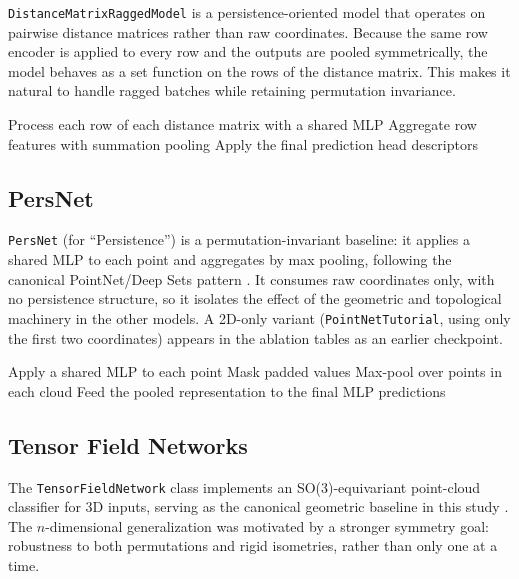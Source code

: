\documentclass[a4paper,11pt]{article}
\begin{document}
\texttt{DistanceMatrixRaggedModel} is a persistence-oriented model that operates on pairwise distance matrices rather than raw coordinates.
Because the same row encoder is applied to every row and the outputs are pooled symmetrically, the model behaves as a set function on the rows of the distance matrix.
This makes it natural to handle ragged batches while retaining permutation invariance.

\begin{algorithm}[H]
\SetAlgoLined
\caption{DistanceMatrixRaggedModel Forward Pass}
\label{alg:distance_matrix_ragged}

Process each row of each distance matrix with a shared MLP\;
Aggregate row features with summation pooling\;
Apply the final prediction head\;
\Return descriptors\;
\end{algorithm}

\subsection{PersNet}

\texttt{PersNet} (for ``Persistence'') is a permutation-invariant baseline: it applies a shared MLP to each point and aggregates by max pooling, following the canonical PointNet/Deep Sets pattern \cite{deepsets2017,pointnet2017}.
It consumes raw coordinates only, with no persistence structure, so it isolates the effect of the geometric and topological machinery in the other models.
A 2D-only variant (\texttt{PointNetTutorial}, using only the first two coordinates) appears in the ablation tables as an earlier checkpoint.

\begin{algorithm}[H]
\SetAlgoLined
\caption{PersNet Forward Pass}
\label{alg:persnet}

Apply a shared MLP to each point\;
Mask padded values\;
Max-pool over points in each cloud\;
Feed the pooled representation to the final MLP\;
\Return predictions\;
\end{algorithm}

\subsection{Tensor Field Networks}

The \texttt{TensorFieldNetwork} class implements an SO(3)-equivariant point-cloud classifier for 3D inputs, serving as the canonical geometric baseline in this study \cite{tfn2018}.
The $n$-dimensional generalization was motivated by a stronger symmetry goal: robustness to both permutations and rigid isometries, rather than only one at a time.
\end{document}
